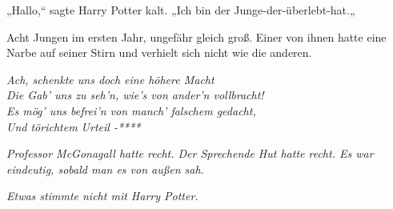 {„Hallo,“ sagte Harry Potter kalt. „Ich bin der Junge-der-überlebt-hat.„

Acht Jungen im ersten Jahr, ungefähr gleich groß. Einer von ihnen hatte eine Narbe auf seiner Stirn und verhielt sich nicht wie die anderen.

\emph{Ach, schenkte uns doch eine höhere Macht\\ Die Gab' uns zu seh'n, wie's von ander'n vollbracht!\\ Es mög' uns befrei'n von manch' falschem gedacht,\\ Und törichtem Urteil -****}

\emph{Professor McGonagall hatte recht. Der Sprechende Hut hatte recht. Es war eindeutig, sobald man es von außen sah.}

\emph{Etwas stimmte nicht mit Harry Potter.}

}
